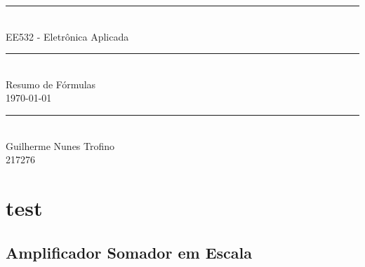 \documentclass{article}
\begin{document}
    \begin{titlepage}
        \begin{center}
            \rule{450pt}{0.5pt}\\[4mm]
            {\Huge EE532 - Eletrônica Aplicada}\\
            \rule{450pt}{0.5pt}\\[2mm]
            {\Large Resumo de Fórmulas}\\[200mm]
            \today\\
            \rule{250pt}{0.5pt}\\
            {\large Guilherme Nunes Trofino}\\
            {\large 217276}\\
        \end{center}
    \end{titlepage}
\newpage

    \section{test}
    \subsection{Amplificador Somador em Escala}
\end{document}
